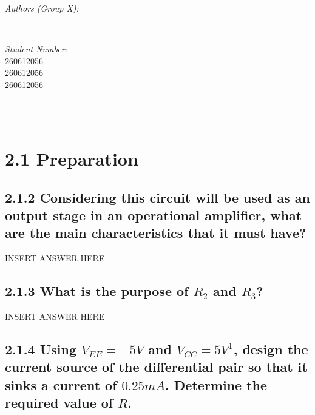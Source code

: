\documentclass[12pt]{article}
\makeatletter
\let\theauthor\@author
\let\thedate\@date
\makeatother
\begin{document}
\begin{titlepage}
\begin{minipage}{0.4\textwidth}
\begin{flushleft}
            \emph{Authors (Group X):}\\
            \theauthor
            \end{flushleft}
            \end{minipage}~
            \begin{minipage}{0.4\textwidth}
            \begin{flushright} \large
            \emph{Student Number:} \\
            260612056 \\ 260612056 \\ 260612056                                  %
        \end{flushright}
    \end{minipage}\\[2 cm]
 
    {\large \thedate}\\[2 cm]
 
    \vfill
    
\end{titlepage}


\section*{2.1 Preparation}

\subsection*{2.1.2 Considering this circuit will be used as an output stage in an operational amplifier, what are the main characteristics that it must have?}

INSERT ANSWER HERE

\subsection*{2.1.3 What is the purpose of $R_2$ and $R_3$?}

INSERT ANSWER HERE

\subsection*{2.1.4 Using $V_{EE} = -5V$ and $V_{CC} = 5V^1$, design the current source of the differential pair so that it sinks a current of $0.25mA$. Determine the required value of $R$.}
\end{document}
